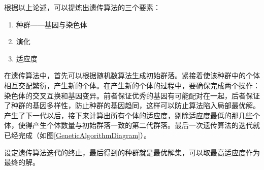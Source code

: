 根据以上论述，可以提炼出遗传算法的三个要素：

\begin{enumerate}
    \item 种群——基因与染色体
    \item 演化
    \item 适应度
\end{enumerate}

在遗传算法中，首先可以根据随机数算法生成初始群落。紧接着使该种群中的个体相互交配繁衍，产生新的个体。在产生新的个体的过程中，要确保完成两个操作：染色体的交叉互换和基因变异。前者保证优秀的基因有可能配对在一起，后者保证了种群的基因多样性，防止种群的基因趋同，这样可以防止算法陷入局部最优解。产生了下一代以后，接下来计算出所有个体的适应度，剔除适应度最低的那几些个体，使得产生个体数量与初始群落一致的第二代群落。最后一次遗传算法的迭代就已经完成（如图\ref{GeneticAlgorithmDiagram}）。

设定遗传算法迭代的终止，最后得到的种群就是最优解集，可以取最高适应度作为最终的解。

